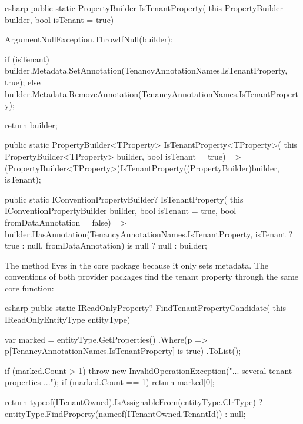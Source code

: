 \begin{sourcecode}{csharp}
public static PropertyBuilder IsTenantProperty(
    this PropertyBuilder builder, bool isTenant = true)
{
    ArgumentNullException.ThrowIfNull(builder);

    if (isTenant)
        builder.Metadata.SetAnnotation(TenancyAnnotationNames.IsTenantProperty, true);
    else
        builder.Metadata.RemoveAnnotation(TenancyAnnotationNames.IsTenantProperty);

    return builder;
}

public static PropertyBuilder<TProperty> IsTenantProperty<TProperty>(
    this PropertyBuilder<TProperty> builder, bool isTenant = true)
    => (PropertyBuilder<TProperty>)IsTenantProperty((PropertyBuilder)builder, isTenant);

public static IConventionPropertyBuilder? IsTenantProperty(
    this IConventionPropertyBuilder builder,
    bool isTenant = true,
    bool fromDataAnnotation = false)
    => builder.HasAnnotation(TenancyAnnotationNames.IsTenantProperty,
           isTenant ? true : null, fromDataAnnotation) is null
        ? null
        : builder;
\end{sourcecode}

The method lives in the core package because it only sets metadata. The conventions of both
provider packages find the tenant property through the same core function:

\begin{sourcecode}{csharp}
public static IReadOnlyProperty? FindTenantPropertyCandidate(
    this IReadOnlyEntityType entityType)
{
    var marked = entityType.GetProperties()
        .Where(p => p[TenancyAnnotationNames.IsTenantProperty] is true)
        .ToList();

    if (marked.Count > 1)
        throw new InvalidOperationException("... several tenant properties ...");
    if (marked.Count == 1)
        return marked[0];

    return typeof(ITenantOwned).IsAssignableFrom(entityType.ClrType)
        ? entityType.FindProperty(nameof(ITenantOwned.TenantId))
        : null;
}
\end{sourcecode}

